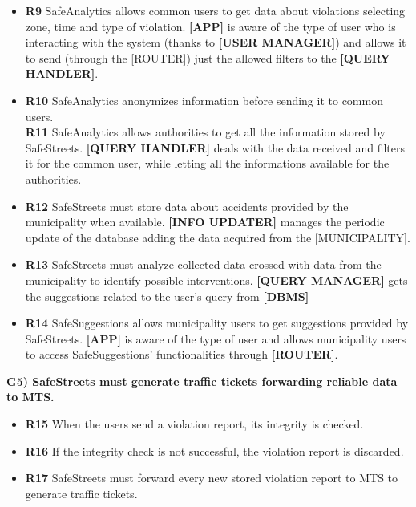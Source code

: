 \documentclass[a4paper]{article}
\begin{document}

\begin{itemize}
\item
  \textbf{R9} SafeAnalytics allows common users to get data about
  violations selecting zone, time and type of violation.
  \subitem	
	\textbf{[APP]} is aware of the type of user who is interacting with the system (thanks to \textbf{[USER MANAGER]}) and allows it to send (through the [ROUTER]) just the allowed filters to the \textbf{[QUERY HANDLER]}.
  
\item
  \textbf{R10} SafeAnalytics anonymizes information before sending it to
  common users.\\
  \textbf{R11} SafeAnalytics allows authorities to get all the information
  stored by SafeStreets.
  \subitem
    \textbf{[QUERY HANDLER]} deals with the data received and filters it for the common user, while letting all the informations available for the authorities.

\end{itemize}

\begin{itemize}
\item
  \textbf{R12} SafeStreets must store data about accidents provided by
  the municipality when available.
  \subitem
    \textbf{[INFO UPDATER]} manages the periodic update of the database adding the data acquired from the [MUNICIPALITY].
    
\item
  \textbf{R13} SafeStreets must analyze collected data crossed with data
  from the municipality to identify possible interventions.
  \subitem
    \textbf{[QUERY MANAGER]} gets the suggestions related to the user's query from \textbf{[DBMS]} %
    
\item
  \textbf{R14} SafeSuggestions allows municipality users to get
  suggestions provided by SafeStreets.
  \subitem
  	\textbf{[APP]} is aware of the type of user and  allows municipality users to access SafeSuggestions' functionalities through \textbf{[ROUTER]}. 
\end{itemize}

\textbf{G5) SafeStreets must generate traffic tickets forwarding
reliable data to MTS.}

\begin{itemize}
\item
  \textbf{R15} When the users send a violation report, its integrity is
  checked.
\item
  \textbf{R16} If the integrity check is not successful, the violation
  report is discarded.
\item
  \textbf{R17} SafeStreets must forward every new stored violation
  report to MTS to generate traffic tickets.
\end{itemize}
\end{document}
